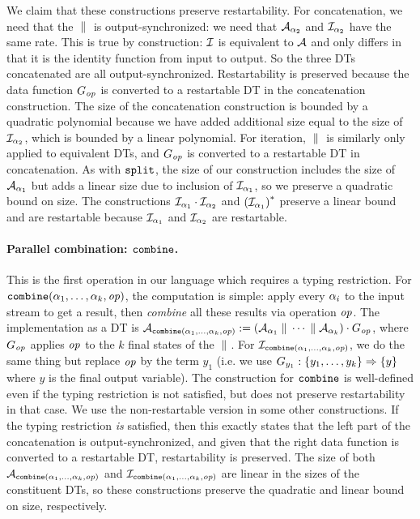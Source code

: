We claim that these constructions preserve restartability. For concatenation, we need that the $\; \| \;$ is output-synchronized: we need that $\mathcal{A}_{\alpha_2}$ and $\mathcal{I}_{\alpha_2}$ have the same rate. This is true by construction: $\mathcal{I}$ is equivalent to $\mathcal{A}$ and only differs in that it is the identity function from input to output.
So the three DTs concatenated are all output-synchronized. Restartability is preserved because the data function $G_{\mathit{op}}$ is converted to a restartable DT in the concatenation construction.
The size of the concatenation construction is bounded by a quadratic polynomial because we have added additional size equal to the size of $\mathcal{I}_{\alpha_2}$, which is bounded by a linear polynomial.
For iteration, $\; \| \;$ is similarly only applied to equivalent DTs, and $G_{\mathit{op}}$ is converted to a restartable DT in concatenation.
As with $\texttt{split}$, the size of our construction includes the size of $\mathcal{A}_{\alpha_1}$ but adds a linear size due to inclusion of $\mathcal{I}_{\alpha_1}$, so we preserve a quadratic bound on size.
The constructions $\mathcal{I}_{\alpha_1} \cdot \mathcal{I}_{\alpha_2}$
and ${{(\mathcal{I}_{\alpha_1})}^{*}}$ preserve a linear bound and are restartable because $\mathcal{I}_{\alpha_1}$ and $\mathcal{I}_{\alpha_2}$ are restartable.

\paragraph*{Parallel combination: $\texttt{combine}$.}
This is the first operation in our language which requires a typing restriction.
For $\texttt{combine}(\alpha_1, \ldots, \alpha_k, \mathit{op})$, the computation is simple: apply every $\alpha_i$
to the input stream to get a result, then \emph{combine} all these results via operation $\mathit{op}$.
The implementation as a DT is
$\mathcal{A}_{\texttt{combine}(\alpha_1, \ldots, \alpha_k, \mathit{op})} := \left(\mathcal{A}_{\alpha_1} \; \| \; \cdots \; \| \; \mathcal{A}_{\alpha_k}\right) \cdot G_{\mathit{op}}$,
where $G_{\mathit{op}}$ applies $\mathit{op}$ to the $k$ final states of the $\; \| \;$.
For $\mathcal{I}_{\texttt{combine}(\alpha_1,\ldots, \alpha_k, \mathit{op})}$, we do the same thing but replace $\mathit{op}$ by the term $y_1$ (i.e. we use $G_{y_1} : \{y_1,\ldots,y_k\} \Rightarrow \{y\}$ where $y$ is the final output variable).
The construction for $\texttt{combine}$ is well-defined even if the typing restriction is not satisfied, but does not preserve restartability in that case. We use the non-restartable version in some other constructions.
If the typing restriction \emph{is} satisfied, then this exactly states that the left part of the concatenation is output-synchronized, and given that the right data function is converted to a restartable DT, restartability is preserved.
The size of both $\mathcal{A}_{\texttt{combine}(\alpha_1, \ldots, \alpha_k, \mathit{op})}$ and $\mathcal{I}_{\texttt{combine}(\alpha_1,\ldots, \alpha_k, \mathit{op})}$ are linear in the sizes of the constituent DTs, so these constructions preserve the quadratic and linear bound on size, respectively.


